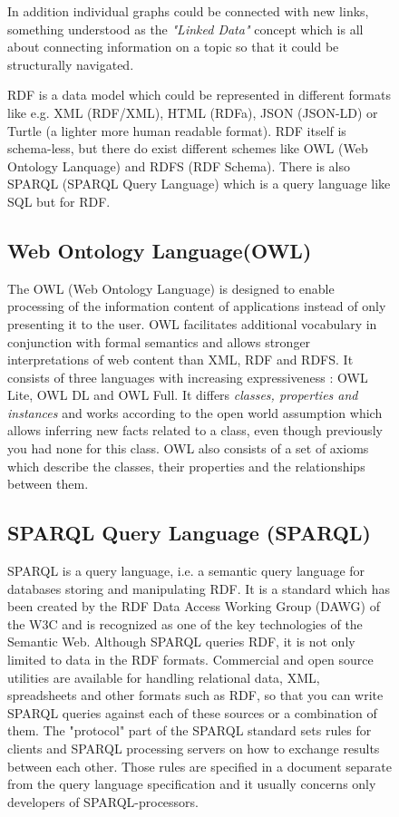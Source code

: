 \begin{figure}[h!]
In addition individual graphs could be connected with new links, something understood as the \textit{"Linked Data"} concept which is all about connecting information on a topic so that it could be structurally navigated.

RDF is a data model which could be represented in different formats like e.g. XML (RDF/XML), HTML (RDFa), JSON (JSON-LD) or Turtle (a lighter more human readable format). RDF itself is schema-less, but there do exist different schemes like OWL (Web Ontology Lanquage) and RDFS (RDF Schema). There is also SPARQL (SPARQL Query Language) which is a query language like SQL but for RDF.

\subsection{Web Ontology Language(OWL)}
The OWL (Web Ontology Language) is designed to enable processing of the information content of applications instead of only presenting it to the user. OWL facilitates additional vocabulary in conjunction with formal semantics and allows stronger interpretations of web content than XML, RDF and RDFS. It consists of three languages with increasing expressiveness : OWL Lite, OWL DL and OWL Full. It differs \textit{classes, properties and instances} and works according to the open world assumption which allows  inferring new facts related to a class, even though previously you had none for this class. OWL also consists of a set of axioms which describe the classes, their properties and the relationships between them.

\subsection{SPARQL Query Language (SPARQL)}
SPARQL is a query language, i.e. a semantic query language for databases storing and manipulating RDF. It is a standard which has been created by the RDF Data Access Working Group (DAWG) of the W3C and is recognized as one of the key technologies of the Semantic Web. Although SPARQL queries RDF, it is not only limited to data in the RDF formats. Commercial and open source utilities are available for handling relational data, XML, spreadsheets and other formats such as RDF, so that you can write SPARQL queries against each of these sources or a combination of them. The "protocol" part of the SPARQL standard sets rules for clients and SPARQL processing servers on how to exchange results between each other. Those rules are specified in a document separate from the query language specification and it usually concerns only developers of SPARQL-processors.


\end{figure}

